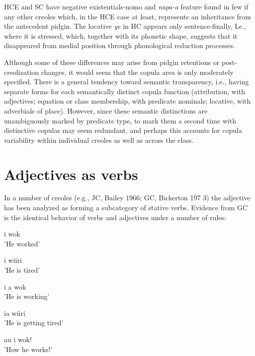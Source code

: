 HCE and SC have negative existentials-nomo and \textit{napa-a} feature found in few if any other creoles which, in the HCE case at least, represents an inheritance from the antecedent pidgin. The locative \textit{ye} in HC appears only sentence-finally, Le., where it is stressed, which, together with its phonetic shape, suggests that it disappeared from medial position through phonological reduction processes.


Although some of these differences may arise from pidgin retentions or post-creolization changes, it would seem that the copula area is only moderately specified. There is a general tendency toward semantic transparency, i.e., having separate forms for each semantically distinct copula function (attribution, with adjectives; equation or class membership, with predicate nominals; locative, with adverbials of place). However, since these semantic distinctions are unambiguously marked by predicate type, to mark them a second time with distinc\-tive copulas may seem redundant, and perhaps this accounts for copula variability within individual creoles as well as across the class.

\section{Adjectives as verbs}

In a number of creoles (e.g., JC, Bailey 1966; GC, Bickerton 197 3) the adjective has been analyzed as forming a subcategory of stative verbs. Evidence from GC is the identical behavior of verbs and adjectives under a number of rules:

\ea\label{ex:63}
 {i} {wok}\\
\glt'He worked'
\z



\ea\label{ex:64}
 {{i}} {{wiiri}}\\
\glt'He is tired'
\z



\ea\label{ex:65}
i a wok\\
\glt'He is working'
\z



\ea\label{ex:66}
ia {wiiri}\\
\glt'He is getting tired'
\z



\ea\label{ex:67}
au i wok!\\
\glt'How he works!'
\z



